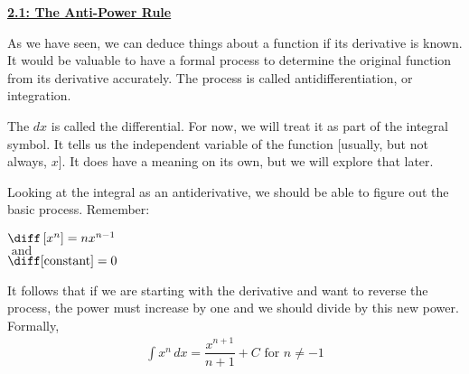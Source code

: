 \textbf{\underline{\large{2.1: The Anti-Power Rule }}} \par

As we have seen, we can deduce things about a function if its derivative is known. It would be valuable to have a formal process to determine the original function from its derivative accurately. The process is called antidifferentiation, or integration. \par

\begin{center}  
\end{center}

The $dx$ is called the differential. For now, we will treat it as part of the integral symbol. It tells us the independent variable of the function [usually, but not always, $x$]. It does have a meaning on its own, but we will explore that later. \par

Looking at the integral as an antiderivative, we should be able to figure out the basic process. Remember: \begin{center}
    $\diff \left[x^n\right] = nx^{n - 1}$ \\[11pt]
    $\text{ and }$ \\[11pt]
   $ \diff [\text{constant}] = 0$ \\[11pt]
\end{center}

It follows that if we are starting with the derivative and want to reverse the process, the power must increase by one and we should divide by this new power. Formally, \begin{align*}
    \int x^n \, dx = \dfrac{x^{n + 1}}{n + 1} + C \text{ for } n \neq -1
\end{align*}